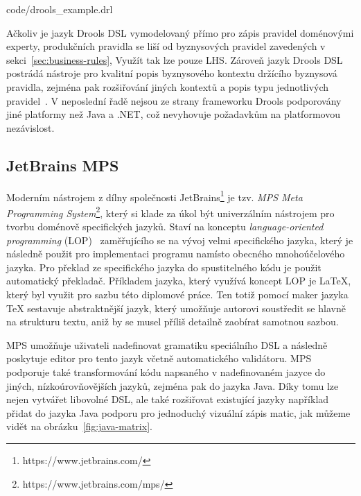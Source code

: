 
{code/drools_example.drl}

Ačkoliv je jazyk Drools \gls{DSL} vymodelovaný přímo pro zápis pravidel doménovými experty,
produkčních pravidla se liší od byznysových pravidel zavedených v sekci~\ref{sec:business-rules},
Využít tak lze pouze \gls{LHS}. Zároveň jazyk Drools \gls{DSL} postrádá
nástroje pro kvalitní popis byznysového kontextu držícího byznysová pravidla,
zejména pak rozšiřování jiných kontextů a popis typu jednotlivých pravidel~\cite{cemus2017automated}.
V neposlední řadě nejsou ze strany frameworku Drools podporovány jiné platformy než
Java a .NET, což nevyhovuje požadavkům na platformovou nezávislost.

\subsection{JetBrains MPS}

Moderním nástrojem z dílny společnosti JetBrains\footnote{https://www.jetbrains.com/}
je tzv. \textit{MPS \textendash\xspace Meta Programming System}\footnote{https://www.jetbrains.com/mps/}, který si klade za úkol být univerzálním
nástrojem pro tvorbu doménově specifických jazyků. Staví na konceptu \textit{language-oriented
programming} (\gls{LOP})~\cite{ward1994language} zaměřujícího se na vývoj velmi specifického jazyka,
který je následně použit pro implementaci programu namísto obecného mnohoúčelového jazyka. Pro překlad
ze specifického jazyka do spustitelného kódu je použit automatický překladač. Příkladem jazyka, který využívá koncept \gls{LOP}
je \LaTeX\xspace, který byl využit pro sazbu této diplomové práce. Ten totiž pomocí maker jazyka \TeX\xspace
sestavuje abstraktnější jazyk, který umožňuje autorovi soustředit se hlavně na strukturu textu, aniž by
se musel příliš detailně zaobírat samotnou sazbou.

MPS umožňuje uživateli nadefinovat gramatiku speciálního \gls{DSL} a následně poskytuje
editor pro tento jazyk včetně automatického validátoru. MPS podporuje také transformování kódu napsaného
v nadefinovaném jazyce do jiných, nízkoúrovňovějších jazyků, zejména pak do jazyka Java.
Díky tomu lze nejen vytvářet libovolné \gls{DSL}, ale také rozšiřovat existující
jazyky \textendash\xspace například přidat do jazyka Java podporu pro jednoduchý vizuální
zápis matic, jak můžeme vidět na obrázku~\ref{fig:java-matrix}.

